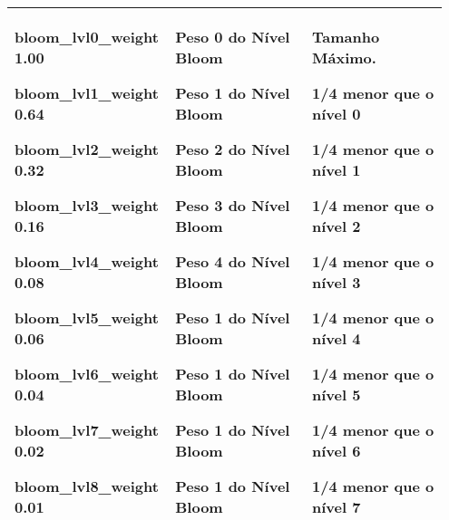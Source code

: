 \documentclass[letterpaper,10pt,brazil]{sphinxmanual}
\begin{document}
\noindent\begin{tabular}{|p{0.317\linewidth}|p{0.317\linewidth}|p{0.317\linewidth}|}
\hline

\begin{DUlineblock}{0em}
\item[] bloom\_lvl0\_weight    1.00
\item[] bloom\_lvl1\_weight    0.64
\item[] bloom\_lvl2\_weight    0.32
\item[] bloom\_lvl3\_weight    0.16
\item[] bloom\_lvl4\_weight    0.08
\item[] bloom\_lvl5\_weight    0.06
\item[] bloom\_lvl6\_weight    0.04
\item[] bloom\_lvl7\_weight    0.02
\item[] bloom\_lvl8\_weight    0.01
\end{DUlineblock}
&
\begin{DUlineblock}{0em}
\item[] Peso 0 do Nível Bloom
\item[] Peso 1 do Nível Bloom
\item[] Peso 2 do Nível Bloom
\item[] Peso 3 do Nível Bloom
\item[] Peso 4 do Nível Bloom
\item[] Peso 1 do Nível Bloom
\item[] Peso 1 do Nível Bloom
\item[] Peso 1 do Nível Bloom
\item[] Peso 1 do Nível Bloom
\end{DUlineblock}
&
\begin{DUlineblock}{0em}
\item[] Tamanho Máximo.
\item[] 1/4 menor que o nível 0
\item[] 1/4 menor que o nível 1
\item[] 1/4 menor que o nível 2
\item[] 1/4 menor que o nível 3
\item[] 1/4 menor que o nível 4
\item[] 1/4 menor que o nível 5
\item[] 1/4 menor que o nível 6
\item[] 1/4 menor que o nível 7
\end{DUlineblock}
\\
\hline\end{tabular}
\end{document}
